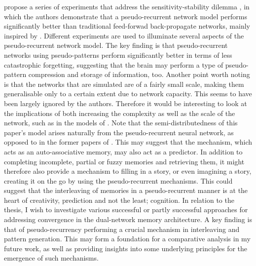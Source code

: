 \citep{French1997} propose a series of experiments that address the sensitivity-stability dilemma \citep{Hebb1949}, in which the authors demonstrate that a pseudo-recurrent network model performs significantly better than traditional feed-forwad back-propagate networks, mainly inspired by \cite{McClelland1995}. Different experiments are used to illuminate several aspects of the pseudo-recurrent network model. The key finding is that pseudo-recurrent networks using pseudo-patterns perform significantly better in terms of less catastrophic forgetting, suggesting that the brain may perform a type of pseudo-pattern compression and storage of information, too. Another point worth noting is that the networks that are simulated are of a fairly small scale, making them generalisable only to a certain extent due to network capacity. This seems to have been largely ignored by the authors. Therefore it would be interesting to look at the implications of both increasing the complexity as well as the scale of the network, such as in the models of \citep{Hattori2010, Hattori2014}. Note that the semi-distributedness of this paper's model arises naturally from the pseudo-recurrent neural network, as opposed to in the former papers of \cite{French1992, French1994}. This may suggest that the mechanism, which acts as an auto-associative memory, may also act as a predictor. In addition to completing incomplete, partial or fuzzy memories and retrieving them, it might therefore also provide a mechanism to filling in a story, or even imagining a story, creating it on the go by using the pseudo-recurrent mechanisms. This could suggest that the interleaving of memories in a pseudo-recurrent manner is at the heart of creativity, prediction and not the least; cognition. In relation to the thesis, I wish to investigate various successful or partly successful approaches for addressing convergence in the dual-network memory architecture. A key finding is that of pseudo-recurrency performing a crucial mechanism in interleaving and pattern generation. This may form a foundation for a comparative analysis in my future work, as well as providing insights into some underlying principles for the emergence of such mechanisms.


